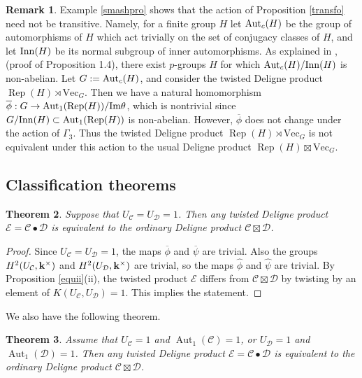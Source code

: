 \documentclass[12pt]{amsart}
\numberwithin{equation}{section}
\newtheorem{theorem}{Theorem}[section]
\theoremstyle{definition}
\newtheorem{remark}[theorem]{Remark}
\newcommand{\Aut}{\text{Aut}}
\newcommand{\Rep}{\text{Rep}}
\newcommand{\1}{_{(1)}}
\newcommand{\2}{_{(2)}}
\newcommand{\3}{_{(3)}}
\newcommand{\4}{_{(4)}}
\newcommand{\5}{_{(5)}}
\newcommand{\6}{_{(6)}}
\newcommand{\C}{\mathcal{C}}
\theoremstyle{plain}
\theoremstyle{definition}
\theoremstyle{remark}
\def\C{\mathcal{C}}
\def\D{\mathcal{D}}
\def\E{\mathcal{E}}
\def\Aut{\mathop{\mathrm{Aut}}\nolimits}
\def\Vec{\mathrm{Vec}}
\def\Rep{\mathop{\mathrm{Rep}}\nolimits}
\begin{document}
\begin{remark} Example \ref{smashpro} shows that the action of Proposition \ref{transfo} need not be transitive. Namely, for a finite group $H$ let ${\rm Aut}_c(H)$ be the group 
of automorphisms of $H$ which act trivially on the set of conjugacy classes of $H$, and 
let ${\rm Inn}(H)$ be its normal subgroup of inner automorphisms. As explained in \cite{GK}, 
(proof of Proposition 1.4), there exist $p$-groups $H$ for which  ${\rm Aut}_c(H)/{\rm Inn}(H)$ 
is non-abelian. Let $G:={\rm Aut}_c(H)$, and consider the twisted Deligne product 
$\Rep(H)\rtimes \Vec_G$. Then we have a natural homomorphism $\overline \phi: G\to \Aut_1(\Rep(H))/{\rm Im}\theta$, which is nontrivial since $G/{\rm Inn}(H)\subset \Aut_1(\Rep(H))$ is non-abelian. However, $\overline \phi$ does not change under the action of $\Gamma_3$.
Thus the twisted Deligne product $\Rep(H)\rtimes \Vec_G$ is not equivalent under this action 
to the usual Deligne product $\Rep(H)\boxtimes \Vec_G$.
\end{remark}

\subsection{Classification theorems} 

\begin{theorem}\label{part1} Suppose that $U_\C=U_\D=1$. Then any twisted Deligne product $\E=\C\bullet \D$ is equivalent to the ordinary Deligne product $\C\boxtimes \D$.  
\end{theorem} 

\begin{proof} Since $U_\C=U_\D=1$, the maps $\overline{\phi}$ and $\overline{\psi}$ are trivial. 
Also the groups $H^2(U_\C,\bold k^\times)$ and $H^2(U_\D,\bold k^\times)$ are trivial, so the maps $\widehat{\phi}$ and $\widehat{\psi}$ are trivial. 
By Proposition \ref{equii}(ii), the twisted product $\E$ differs from $\C\boxtimes \D$ by twisting by an element of $K(U_\C,U_\D)=1$. This implies the statement. 
\end{proof} 

We also have the following theorem. 

\begin{theorem}\label{part2} Assume that $U_\C=1$ and $\Aut_1(\C)=1$, or $U_\D=1$ and $\Aut_1(\D)=1$. Then any twisted Deligne product $\E=\C\bullet \D$ is equivalent to the ordinary Deligne product $\C\boxtimes \D$. 
\end{theorem} 
\end{document}
